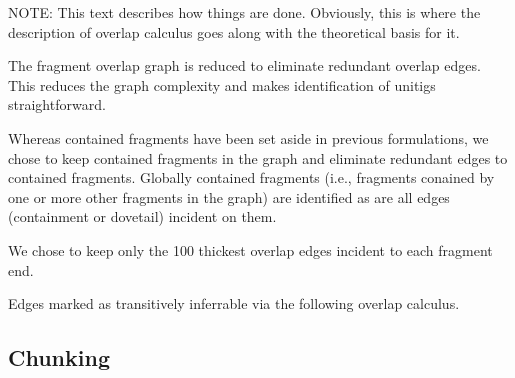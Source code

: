 \documentclass{article}
\begin{document}

%
  NOTE: This text describes how things are done. Obviously, this is where the description of overlap calculus goes along with the theoretical basis for it.

  The fragment overlap graph is reduced to eliminate redundant overlap
edges. This reduces the graph complexity and makes identification of
unitigs straightforward.

  Whereas contained fragments have been set aside in previous
formulations, we chose to keep contained fragments in the graph and
eliminate redundant edges to contained fragments. Globally contained
fragments (i.e., fragments conained by one or more other fragments in
the graph) are identified as are all edges (containment or dovetail)
incident on them.

  We chose to keep only the 100 thickest overlap edges incident to each fragment end.

  Edges marked as transitively inferrable via the following overlap calculus.

\subsection{Chunking}

%
%
%
%
%
%
%
\end{document}
